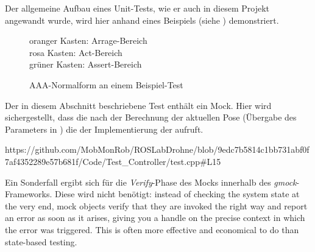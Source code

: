 Der allgemeine Aufbau eines Unit-Tests, wie er auch in diesem Projekt angewandt wurde, wird hier anhand eines Beispiels (siehe ) demonstriert.

\begin{figure}[ht!]
\vspace{0.25cm}
\begin{center}
\caption{AAA-Normalform an einem Beispiel-Test}
\label{fig:TestAAA}
\end{center}

\vspace{0.25cm}
oranger Kasten:	Arrage-Bereich\\
rosa Kasten: Act-Bereich\\
grüner Kasten: Assert-Bereich
\end{figure}


\clearpage
{}
Der in diesem Abschnitt beschriebene Test enthält ein Mock.
Hier wird sichergestellt, dass die  nach der Berechnung der aktuellen Pose (Übergabe des Parameters in ) die  der Implementierung der  aufruft.

https://github.com/MobMonRob/ROSLabDrohne/blob/9edc7b5814c1bb731abf0f7af4352289e57b681f/Code/Test\_Controller/test.cpp\#L15

Ein Sonderfall ergibt sich für die \textit{Verify}-Phase des Mocks innerhalb des \textit{gmock}-Frameworks. Diese wird nicht benötigt:
\glqq instead of checking the system state at the very end, mock objects verify that they are invoked the right way and report an error as soon as it arises, giving you a handle on the precise context in which the error was triggered. This is often more effective and economical to do than state-based testing.\grqq \cite{gmockFAQ}


